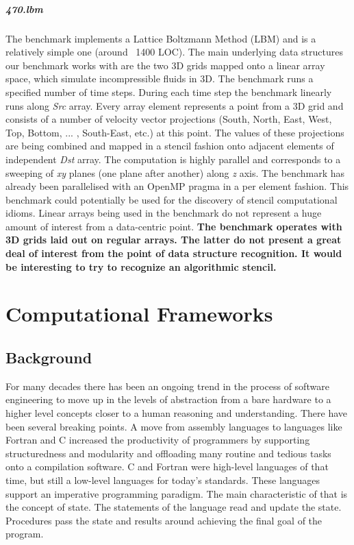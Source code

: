 \documentclass[10pt,a4paper]{report}
\begin{document}
\paragraph{470.lbm} The benchmark implements a Lattice Boltzmann Method (LBM) and is a relatively simple one (around ~1400 LOC). The main underlying data structures our benchmark works with are the two 3D grids mapped onto a linear array space, which simulate incompressible fluids in 3D. The benchmark runs a specified number of time steps. During each time step the benchmark linearly runs along \textit{Src} array. Every array element represents a point from a 3D grid and consists of a number of velocity vector projections (South, North, East, West, Top, Bottom,  ... , South-East, etc.) at this point. The values of these projections are being combined and mapped in a stencil fashion onto adjacent elements of independent \textit{Dst} array. The computation is highly parallel and corresponds to a sweeping of \textit{xy} planes (one plane after another) along \textit{z} axis. The benchmark has already been parallelised with an OpenMP pragma in a per element fashion. This benchmark could potentially be used for the discovery of stencil computational idioms. Linear arrays being used in the benchmark do not represent a huge amount of interest from a data-centric point.\newline\null
\quad\textbf{The benchmark operates with 3D grids laid out on regular arrays. The latter do not present a great deal of interest from the point of data structure recognition. It would be interesting to try to recognize an algorithmic stencil.}

\chapter{Computational Frameworks}

\section{Background}
\quad For many decades there has been an ongoing trend in the process of software engineering to move up in the levels of abstraction from a bare hardware to a higher level concepts closer to a human reasoning and understanding. There have been several breaking points. A move from assembly languages to languages like Fortran and C increased the productivity of programmers by supporting structuredness and modularity and offloading many routine and tedious tasks onto a compilation software. C and Fortran were high-level languages of that time, but still a low-level languages for today's standards. These languages support an imperative programming paradigm. The main characteristic of that is the concept of state. The statements of the language read and update the state. Procedures pass the state and results around achieving the final goal of the program.   
\end{document}
